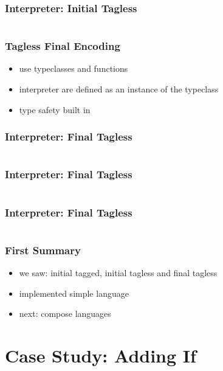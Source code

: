 \documentclass[aspectratio=169, hyperref={colorlinks, linkcolor=beamer@centricgreen}, urlcolor=links]{beamer}
\begin{document}
\begin{frame}[fragile]
  \frametitle{Interpreter: Initial Tagless}
  \inputminted[fontsize=\footnotesize]{scala}{snippets/initial-tagless-add.scala}
\end{frame}

\begin{frame}
  \frametitle{Tagless Final Encoding}
  \begin{itemize}
  \item use typeclasses and functions
  \item interpreter are defined as an instance of the typeclass
  \item type safety built in
  \end{itemize}
\end{frame}

\begin{frame}[fragile]
  \frametitle{Interpreter: Final Tagless}
  \inputminted[fontsize=\footnotesize]{scala}{snippets/final-tagless-expr.scala}
\end{frame}

\begin{frame}[fragile]
  \frametitle{Interpreter: Final Tagless}
  \inputminted[fontsize=\footnotesize]{scala}{snippets/final-tagless-sample.scala}
\end{frame}

\begin{frame}[fragile]
  \frametitle{Interpreter: Final Tagless}
  \inputminted[fontsize=\footnotesize]{scala}{snippets/final-tagless-interp.scala}
\end{frame}

\begin{frame}
  \frametitle{First Summary}
  \begin{itemize}
  \item we saw: initial tagged, initial tagless and final tagless
  \item implemented simple language
  \item next: compose languages
  \end{itemize}
\end{frame}

\section{Case Study: Adding If}\label{sec:case-study-if}
\end{document}
